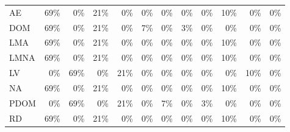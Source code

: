 \begin{figure*}
\begin{tabular}{lrrrrrrrrrrr}
AE    & \cellcolor{lightgreen}69\%   & \cellcolor{lightred}0\%   & \cellcolor{lightgreen}21\%   & \cellcolor{lightred}0\%   & \cellcolor{lightred}0\%   & \cellcolor{lightred}0\%   & \cellcolor{lightred}0\%   & \cellcolor{lightred}0\%   & \cellcolor{lightgreen}10\%   & \cellcolor{lightred}0\%   & \cellcolor{lightred}0\% \\
DOM   & \cellcolor{lightgreen}69\%   & \cellcolor{lightred}0\%   & \cellcolor{lightgreen}21\%   & \cellcolor{lightred}0\%   & \cellcolor{lightblack}7\%   & \cellcolor{lightred}0\%   & \cellcolor{lightblack}3\%   & \cellcolor{lightred}0\%   & \cellcolor{lightred}0\%   & \cellcolor{lightred}0\%   & \cellcolor{lightred}0\% \\
LMA   & \cellcolor{lightgreen}69\%   & \cellcolor{lightred}0\%   & \cellcolor{lightgreen}21\%   & \cellcolor{lightred}0\%   & \cellcolor{lightred}0\%   & \cellcolor{lightred}0\%   & \cellcolor{lightred}0\%   & \cellcolor{lightred}0\%   & \cellcolor{lightgreen}10\%   & \cellcolor{lightred}0\%   & \cellcolor{lightred}0\% \\
LMNA  & \cellcolor{lightgreen}69\%   & \cellcolor{lightred}0\%   & \cellcolor{lightgreen}21\%   & \cellcolor{lightred}0\%   & \cellcolor{lightred}0\%   & \cellcolor{lightred}0\%   & \cellcolor{lightred}0\%   & \cellcolor{lightred}0\%   & \cellcolor{lightgreen}10\%   & \cellcolor{lightred}0\%   & \cellcolor{lightred}0\% \\
LV    & \cellcolor{lightred}0\%   & \cellcolor{lightgreen}69\%   & \cellcolor{lightred}0\%   & \cellcolor{lightgreen}21\%   & \cellcolor{lightred}0\%   & \cellcolor{lightred}0\%   & \cellcolor{lightred}0\%   & \cellcolor{lightred}0\%   & \cellcolor{lightred}0\%   & \cellcolor{lightgreen}10\%   & \cellcolor{lightred}0\% \\
NA    & \cellcolor{lightgreen}69\%   & \cellcolor{lightred}0\%   & \cellcolor{lightgreen}21\%   & \cellcolor{lightred}0\%   & \cellcolor{lightred}0\%   & \cellcolor{lightred}0\%   & \cellcolor{lightred}0\%   & \cellcolor{lightred}0\%   & \cellcolor{lightgreen}10\%   & \cellcolor{lightred}0\%   & \cellcolor{lightred}0\% \\
PDOM  & \cellcolor{lightred}0\%   & \cellcolor{lightgreen}69\%   & \cellcolor{lightred}0\%   & \cellcolor{lightgreen}21\%   & \cellcolor{lightred}0\%   & \cellcolor{lightblack}7\%   & \cellcolor{lightred}0\%   & \cellcolor{lightblack}3\%   & \cellcolor{lightred}0\%   & \cellcolor{lightred}0\%   & \cellcolor{lightred}0\% \\
RD    & \cellcolor{lightgreen}69\%   & \cellcolor{lightred}0\%   & \cellcolor{lightgreen}21\%   & \cellcolor{lightred}0\%   & \cellcolor{lightred}0\%   & \cellcolor{lightred}0\%   & \cellcolor{lightred}0\%   & \cellcolor{lightred}0\%   & \cellcolor{lightgreen}10\%   & \cellcolor{lightred}0\%   & \cellcolor{lightred}0\% \\

\end{tabular}
\end{figure*}
